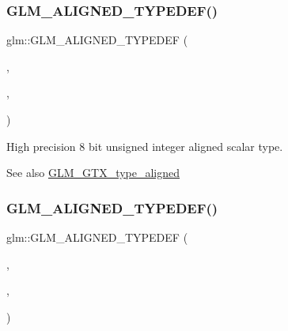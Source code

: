 \subsubsection{\texorpdfstring{G\+L\+M\+\_\+\+A\+L\+I\+G\+N\+E\+D\+\_\+\+T\+Y\+P\+E\+D\+E\+F()}{GLM\_ALIGNED\_TYPEDEF()}\hspace{0.1cm}{\footnotesize\ttfamily [97/209]}}
{\footnotesize\ttfamily glm\+::\+G\+L\+M\+\_\+\+A\+L\+I\+G\+N\+E\+D\+\_\+\+T\+Y\+P\+E\+D\+EF (\begin{DoxyParamCaption}\item[{\hyperlink{group__gtc__type__precision_ga9ba529fcc75b82d23da979f0ce6e4518}{highp\+\_\+uint8\+\_\+t}}]{,  }\item[{aligned\+\_\+highp\+\_\+uint8\+\_\+t}]{,  }\item[{1}]{ }\end{DoxyParamCaption})}

High precision 8 bit unsigned integer aligned scalar type. \begin{DoxySeeAlso}{See also}
\hyperlink{group__gtx__type__aligned}{G\+L\+M\+\_\+\+G\+T\+X\+\_\+type\+\_\+aligned} 
\end{DoxySeeAlso}
\mbox{\label{group__gtx__type__aligned_ga9fc4421dbb833d5461e6d4e59dcfde55}} 
\subsubsection{\texorpdfstring{G\+L\+M\+\_\+\+A\+L\+I\+G\+N\+E\+D\+\_\+\+T\+Y\+P\+E\+D\+E\+F()}{GLM\_ALIGNED\_TYPEDEF()}\hspace{0.1cm}{\footnotesize\ttfamily [98/209]}}
{\footnotesize\ttfamily glm\+::\+G\+L\+M\+\_\+\+A\+L\+I\+G\+N\+E\+D\+\_\+\+T\+Y\+P\+E\+D\+EF (\begin{DoxyParamCaption}\item[{\hyperlink{group__gtc__type__precision_ga3145bc0ee80432c165e985a188a722b3}{highp\+\_\+uint16\+\_\+t}}]{,  }\item[{aligned\+\_\+highp\+\_\+uint16\+\_\+t}]{,  }\item[{2}]{ }\end{DoxyParamCaption})}

